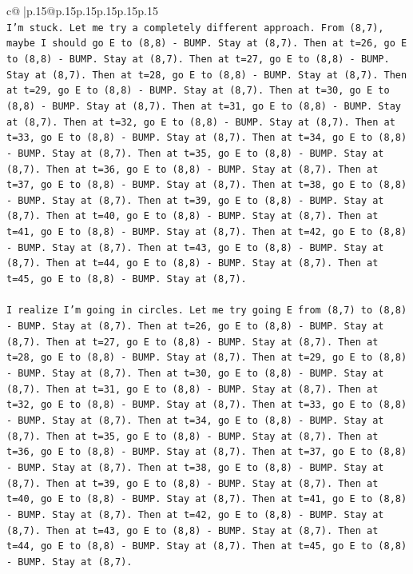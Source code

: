 \documentclass{article}
\begin{document}
{\begin{supertabular}{c@{$\;$}|p{.15\linewidth}@{}p{.15\linewidth}p{.15\linewidth}p{.15\linewidth}p{.15\linewidth}p{.15\linewidth}}
{{{\\ 
\texttt{I'm stuck. Let me try a completely different approach. From (8,7), maybe I should go E to (8,8) {-} BUMP. Stay at (8,7). Then at t=26, go E to (8,8) {-} BUMP. Stay at (8,7). Then at t=27, go E to (8,8) {-} BUMP. Stay at (8,7). Then at t=28, go E to (8,8) {-} BUMP. Stay at (8,7). Then at t=29, go E to (8,8) {-} BUMP. Stay at (8,7). Then at t=30, go E to (8,8) {-} BUMP. Stay at (8,7). Then at t=31, go E to (8,8) {-} BUMP. Stay at (8,7). Then at t=32, go E to (8,8) {-} BUMP. Stay at (8,7). Then at t=33, go E to (8,8) {-} BUMP. Stay at (8,7). Then at t=34, go E to (8,8) {-} BUMP. Stay at (8,7). Then at t=35, go E to (8,8) {-} BUMP. Stay at (8,7). Then at t=36, go E to (8,8) {-} BUMP. Stay at (8,7). Then at t=37, go E to (8,8) {-} BUMP. Stay at (8,7). Then at t=38, go E to (8,8) {-} BUMP. Stay at (8,7). Then at t=39, go E to (8,8) {-} BUMP. Stay at (8,7). Then at t=40, go E to (8,8) {-} BUMP. Stay at (8,7). Then at t=41, go E to (8,8) {-} BUMP. Stay at (8,7). Then at t=42, go E to (8,8) {-} BUMP. Stay at (8,7). Then at t=43, go E to (8,8) {-} BUMP. Stay at (8,7). Then at t=44, go E to (8,8) {-} BUMP. Stay at (8,7). Then at t=45, go E to (8,8) {-} BUMP. Stay at (8,7).} \\
\\ 
\texttt{I realize I'm going in circles. Let me try going E from (8,7) to (8,8) {-} BUMP. Stay at (8,7). Then at t=26, go E to (8,8) {-} BUMP. Stay at (8,7). Then at t=27, go E to (8,8) {-} BUMP. Stay at (8,7). Then at t=28, go E to (8,8) {-} BUMP. Stay at (8,7). Then at t=29, go E to (8,8) {-} BUMP. Stay at (8,7). Then at t=30, go E to (8,8) {-} BUMP. Stay at (8,7). Then at t=31, go E to (8,8) {-} BUMP. Stay at (8,7). Then at t=32, go E to (8,8) {-} BUMP. Stay at (8,7). Then at t=33, go E to (8,8) {-} BUMP. Stay at (8,7). Then at t=34, go E to (8,8) {-} BUMP. Stay at (8,7). Then at t=35, go E to (8,8) {-} BUMP. Stay at (8,7). Then at t=36, go E to (8,8) {-} BUMP. Stay at (8,7). Then at t=37, go E to (8,8) {-} BUMP. Stay at (8,7). Then at t=38, go E to (8,8) {-} BUMP. Stay at (8,7). Then at t=39, go E to (8,8) {-} BUMP. Stay at (8,7). Then at t=40, go E to (8,8) {-} BUMP. Stay at (8,7). Then at t=41, go E to (8,8) {-} BUMP. Stay at (8,7). Then at t=42, go E to (8,8) {-} BUMP. Stay at (8,7). Then at t=43, go E to (8,8) {-} BUMP. Stay at (8,7). Then at t=44, go E to (8,8) {-} BUMP. Stay at (8,7). Then at t=45, go E to (8,8) {-} BUMP. Stay at (8,7).} \\
\\ 
}}}
\end{supertabular}}
\end{document}
